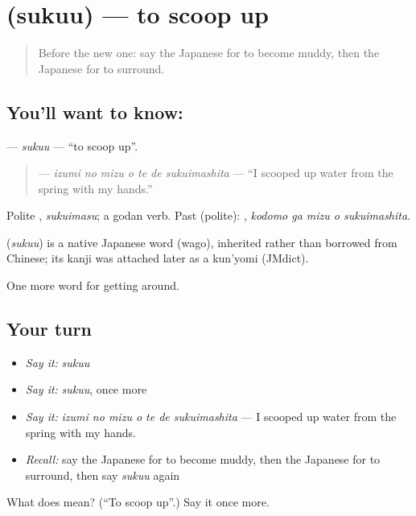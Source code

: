 \section[\texorpdfstring{\ja{すくう} (sukuu)}{すくう (sukuu)}]{ (sukuu) — to scoop up}

\label{lesson:JA-C411-sukuu}



\begin{quote}
Before the new one: say the Japanese for to become muddy, then the Japanese for to surround.
\end{quote}

\subsection*{You'll want to know: }
\textbf{} — \emph{sukuu} — \textquotedblleft{}to scoop up\textquotedblright{}.

\begin{quote}
\textbf{   } — \emph{izumi no mizu o te de sukuimashita} — \textquotedblleft{}I scooped up water from the spring with my hands.\textquotedblright{}
\end{quote}

Polite \textbf{}, \emph{sukuimasu}; a godan verb. Past (polite): \textbf{  }, \emph{kodomo ga mizu o sukuimashita}.

\begin{cousinweb}
\textbf{} (\emph{sukuu}) is a native Japanese word (wago), inherited rather than borrowed from Chinese; its kanji was attached later as a kun'yomi (JMdict).
\end{cousinweb}

\begin{grammarlens}[title={What you've built}]
One more word for getting around.
\end{grammarlens}

\subsection*{Your turn}
\begin{itemize}
\raggedright
  \item \emph{Say it:} \emph{sukuu}
  \item \emph{Say it:} \emph{sukuu}, once more
  \item \emph{Say it:} \emph{izumi no mizu o te de sukuimashita} — I scooped up water from the spring with my hands.
  \item \emph{Recall:} say the Japanese for to become muddy, then the Japanese for to surround, then say \emph{sukuu} again
\end{itemize}

\begin{tcolorbox}[breakable,colback=teal!4,colframe=teal!35!black,title={Before you move on}]
What does  mean? (\textquotedblleft{}To scoop up\textquotedblright{}.) Say it once more.
\end{tcolorbox}
